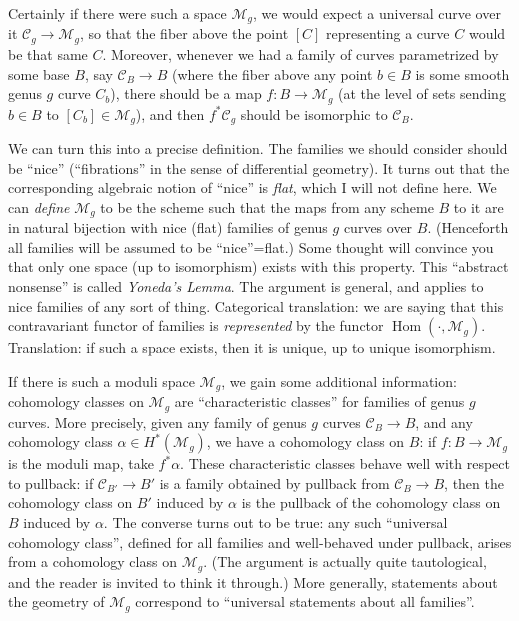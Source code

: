 \documentclass[12pt,letterpaper]{amsart}
\newcommand{\cC}{{\mathcal{C}}}
\newcommand{\cm}{{\mathcal{M}}}
\newcommand{\al}{\alpha}
\newcommand{\Hom}{\operatorname{Hom}}
\begin{document}
{Certainly if there were such a space $\cm_g$, we would expect a
universal curve over it $\cC_g \rightarrow \cm_g$, so that the fiber
above the point $[C]$ representing a curve $C$ would be that same $C$.
Moreover, whenever we had a family of curves parametrized by some base
$B$, say $\cC_B \rightarrow B$ (where the fiber above any point $b \in
B$ is some smooth genus $g$ curve $C_b$), there should be a map $f: B
\rightarrow \cm_g$ (at the level of sets sending $b \in B$ to $[C_b]
\in \cm_g$), and then $f^* \cC_g$ should be isomorphic to $\cC_B$.

We can turn this into a precise definition.  The families we should
consider should be ``nice'' (``fibrations'' in the sense of
differential geometry).  It turns out that the corresponding algebraic
notion of ``nice'' is {\em flat}, which I will not define here.  We
can {\em define} $\cm_g$ to be the scheme such that the maps from any
scheme $B$ to it are in natural bijection with nice (flat) families of
genus $g$ curves over $B$. 
(Henceforth all families will be
assumed to be ``nice''=flat.)
 Some thought will convince you that only
one space (up to isomorphism) exists with this property.  This
``abstract nonsense'' is called {\em Yoneda's Lemma}.  The argument is
general, and  applies to nice families of any sort of
thing.  Categorical translation: we are saying that this contravariant
functor of families is {\em represented} by the functor $\Hom(\cdot,
\cm_g)$.  Translation: if such a space exists, then it is unique, up to
unique isomorphism.

If there is such a moduli space $\cm_g$, we gain some additional
information: cohomology classes on $\cm_g$ are ``characteristic
classes'' for families of genus $g$ curves.  More precisely, given any
family of genus $g$ curves $\cC_B \rightarrow B$, and any cohomology class $\al
\in H^*(\cm_g)$, we have a cohomology class on $B$:
if $f: B \rightarrow \cm_g$ is the moduli map, take $f^*
\al$.  These characteristic classes behave well with respect to pullback:
if $\cC_{B'} \rightarrow B'$ is a family obtained by pullback from 
$\cC_B \rightarrow B$, then the cohomology class on $B'$ induced by $\al$
is the pullback of the cohomology class on $B$ induced by $\al$.
The converse turns out to be true:  any such ``universal cohomology class'',
defined for all families and well-behaved under pullback, arises
from a cohomology class on $\cm_g$.  (The argument is actually quite
tautological, and the reader is invited to think it through.)
More generally, statements about the geometry of $\cm_g$ correspond
to ``universal statements about all families''.

}
\end{document}
